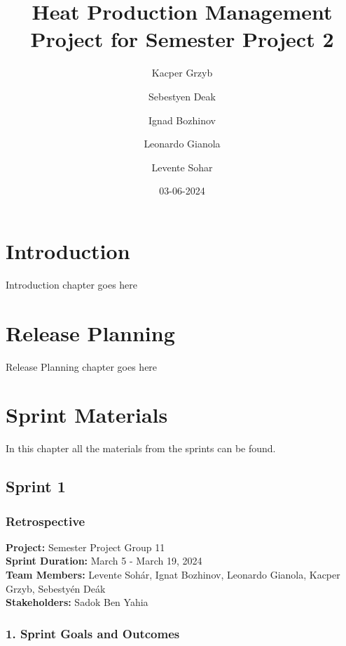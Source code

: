 \documentclass[12pt]{report}
\title{Heat Production Management Project for Semester Project 2}
\author{Kacper Grzyb \and Sebestyen Deak \and Ignad Bozhinov \and Leonardo Gianola \and Levente Sohar}
\date{03-06-2024}
\begin{document}
\maketitle

\tableofcontents

\chapter{Introduction}
Introduction chapter goes here

\chapter{Release Planning}
Release Planning chapter goes here

\chapter{Sprint Materials}
In this chapter all the materials from the sprints can be found.




\section{Sprint 1}
\subsection*{Retrospective}
\textbf{Project:} Semester Project Group 11 \\
\textbf{Sprint Duration:} March 5 - March 19, 2024 \\
\textbf{Team Members:} Levente Sohár, Ignat Bozhinov, Leonardo Gianola, Kacper Grzyb, Sebestyén Deák \\
\textbf{Stakeholders:} Sadok Ben Yahia

\subsection*{1. Sprint Goals and Outcomes}
\end{document}
